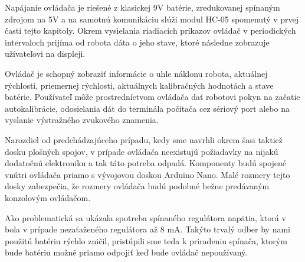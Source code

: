 Napájanie ovládača je riešené z klasickej 9V batérie, zredukovanej spínaným zdrojom na 5V a na samotnú komunikáciu slúži modul HC-05 spomenutý v prvej časti tejto kapitoly. Okrem vysielania riadiacich príkazov ovládač v periodických intervaloch prijíma od robota dáta o jeho stave, ktoré následne zobrazuje užívateľovi na displeji.
 
Ovládač je schopný zobraziť informácie o uhle náklonu robota, aktuálnej rýchlosti, priemernej rýchlosti, aktuálnych kalibračných hodnotách a stave batérie. Používateľ môže prostredníctvom ovládača dať robotovi pokyn na začatie autokalibrácie, odosielania dát do terminála počítača cez sériový port alebo na vyslanie výstražného zvukového znamenia.

Narozdiel od predchádzajúceho prípadu, kedy sme navrhli okrem šasi taktiež dosku plošných spojov, v prípade ovládača neexistujú požiadavky na nijakú dodatočnú elektroniku a tak táto potreba odpadá. Komponenty budú spojené vnútri ovládača priamo s vývojovou doskou Arduino Nano. Malé rozmery tejto dosky zabezpečia, že rozmery ovládača budú podobné bežne predávaným konzolovým ovládačom. 

Ako problematická sa ukázala spotreba spínaného regulátora napätia, ktorá v bola v prípade nezaťaženého regulátora až 8 mA. Takýto trvalý odber by nami použitú batériu rýchlo zničil, pristúpili sme teda k priradeniu spínača, ktorým bude batériu možné priamo odpojiť keď bude ovládač nepoužívaný.